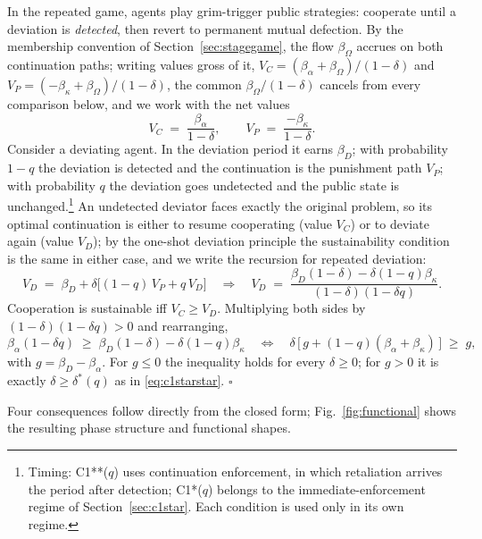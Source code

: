 \documentclass[manuscript,screen,review]{jair}
\begin{document}
In the repeated game, agents play grim-trigger public strategies: cooperate until a deviation is \emph{detected}, then revert to permanent mutual defection. By the membership convention of Section~\ref{sec:stagegame}, the flow $\beta_\Omega$ accrues on both continuation paths; writing values gross of it, $V_C = (\beta_\alpha + \beta_\Omega)/(1-\delta)$ and $V_P = (-\beta_\kappa + \beta_\Omega)/(1-\delta)$, the common $\beta_\Omega/(1-\delta)$ cancels from every comparison below, and we work with the net values
\begin{equation}
V_C \;=\; \frac{\beta_\alpha}{1-\delta}, \qquad V_P \;=\; \frac{-\beta_\kappa}{1-\delta}.
\end{equation}
Consider a deviating agent. In the deviation period it earns $\beta_D$; with probability $1-q$ the deviation is detected and the continuation is the punishment path $V_P$; with probability $q$ the deviation goes undetected and the public state is unchanged.\footnote{Timing: C1**($q$) uses continuation enforcement, in which retaliation arrives the period after detection; C1*($q$) belongs to the immediate-enforcement regime of Section~\ref{sec:c1star}. Each condition is used only in its own regime.} An undetected deviator faces exactly the original problem, so its optimal continuation is either to resume cooperating (value $V_C$) or to deviate again (value $V_D$); by the one-shot deviation principle the sustainability condition is the same in either case, and we write the recursion for repeated deviation:
\begin{equation}
V_D \;=\; \beta_D + \delta\bigl[(1-q)\,V_P + q\,V_D\bigr]
\quad\Longrightarrow\quad
V_D \;=\; \frac{\beta_D(1-\delta) - \delta(1-q)\beta_\kappa}{(1-\delta)(1-\delta q)} .
\end{equation}
Cooperation is sustainable iff $V_C \geq V_D$. Multiplying both sides by $(1-\delta)(1-\delta q) > 0$ and rearranging,
\begin{equation*}
\beta_\alpha (1-\delta q) \;\geq\; \beta_D(1-\delta) - \delta(1-q)\beta_\kappa
\quad\Longleftrightarrow\quad
\delta\,\bigl[\,g + (1-q)(\beta_\alpha+\beta_\kappa)\,\bigr] \;\geq\; g ,
\end{equation*}
with $g = \beta_D - \beta_\alpha$. For $g \leq 0$ the inequality holds for every $\delta \geq 0$; for $g > 0$ it is exactly $\delta \geq \delta^*(q)$ as in \eqref{eq:c1starstar}. \hfill$\square$

Four consequences follow directly from the closed form; Fig.~\ref{fig:functional} shows the resulting phase structure and functional shapes.
\end{document}
